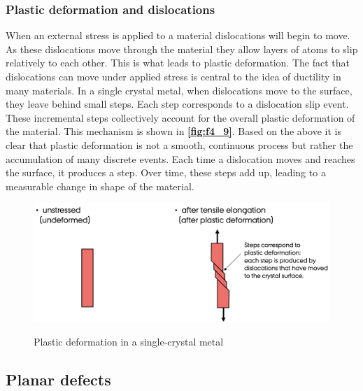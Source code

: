 \subsubsection{Plastic deformation and dislocations}
When an external stress is applied to a material dislocations will begin to move. As these dislocations move through the material they allow layers of atoms to slip relatively to each other. This is what leads to plastic deformation. The fact that dislocations can move under applied stress is central to the idea of ductility in many materials.  In a single crystal metal, when dislocations move to the surface, they leave behind small steps. Each step corresponds to a dislocation slip event. These incremental steps collectively account for the overall plastic deformation of the material. This mechanism is shown in \textbf{\autoref{fig:f4_9}}. Based on the above it is clear that plastic deformation is not a smooth, continuous process but rather the accumulation of many discrete events. Each time a dislocation moves and reaches the surface, it produces a step. Over time, these steps add up, leading to a measurable change in shape of the material.
\begin{figure} [ht]
  \centering
  \caption{Plastic deformation in a single-crystal metal}
  \includegraphics[width=0.75\linewidth]{./figures/f4_9.png}
  \label{fig:f4_9}
\end{figure}

\subsection{Planar defects}
